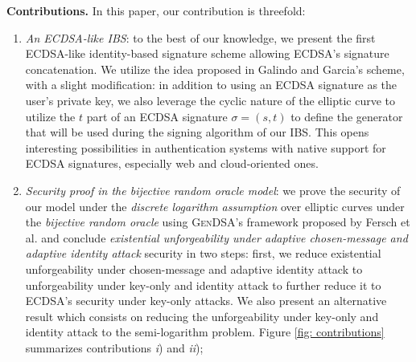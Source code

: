 \documentclass[version=submission, floatrow]{iacrcc}
\begin{document}
\noindent\textbf{Contributions.} In this paper, our contribution is threefold:\begin{enumerate}[label={\emph{\roman*})}]
\item \emph{An ECDSA-like IBS}: to the best of our knowledge, we present the first ECDSA-like identity-based signature scheme allowing ECDSA's signature concatenation. 
%
We utilize the idea proposed in Galindo and Garcia's scheme, with a slight modification: in addition to using an ECDSA signature as the user's private key, we also leverage the cyclic nature of the elliptic curve to utilize the $t$ part of an ECDSA signature $\sigma = (s, t)$ to define the generator that will be used during the signing algorithm of our IBS. This opens interesting possibilities in authentication systems with native support for ECDSA signatures, especially web and cloud-oriented ones.

\item \emph{Security proof in the bijective random oracle model}: we prove the security of our model under the \textit{discrete logarithm assumption} over elliptic curves under the \textit{bijective random oracle} using \textsc{GenDSA}'s framework proposed by Fersch et al. and conclude \textit{existential unforgeability under adaptive chosen-message and adaptive identity attack} security in two steps: first, we reduce existential unforgeability under chosen-message and adaptive identity attack to unforgeability under key-only and identity attack to further reduce it to ECDSA's security under key-only attacks. 
% 
We also present an alternative result which consists on reducing the unforgeability under key-only and identity attack to the semi-logarithm problem. 
% 
Figure \ref{fig: contributions} summarizes contributions \emph{i}) and \emph{ii});


\end{enumerate}
\end{document}
